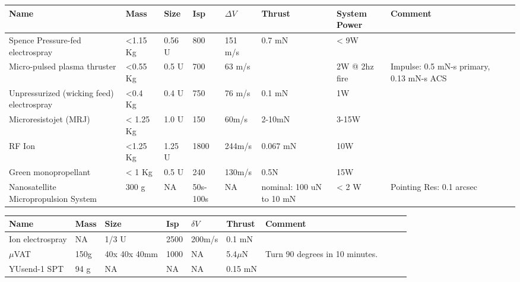 \begin{center}
     \begin{tabular}{ |p{2.25cm} | p{1cm} | p{1cm} |  p{1cm} | l | p{2cm} | l | p{4cm} | p{1cm} | p{2cm} |  }
     \hline

       {\bf Name} & {\bf Mass} & {\bf Size} & {\bf Isp} & {\bf $\Delta V$} & {\bf Thrust} & {\bf System Power}&{\bf Comment}  \\ \hline


     Spence Pressure-fed electrospray \cite{Spence} & <1.15 Kg& 0.56 U& 800 & 151 m/s & 0.7 mN &< 9W &   \\ \hline

     Micro-pulsed plasma thruster \cite{Spence} & <0.55 Kg& 0.5 U & 700 & 63 m/s&  & 2W @ 2hz fire &  Impulse: 0.5 mN-s primary, 0.13 mN-s ACS\\ \hline

     Unpressurized (wicking feed) electrospray \cite{Spence} & <0.4 Kg& 0.4 U& 750 & 76 m/s & 0.1 mN & 1W &  \\
     \hline

     Microresistojet (MRJ) \cite{Spence} & < 1.25 Kg& 1.0 U&150 & 60m/s & 2-10mN & 3-15W&   \\
     \hline

     RF Ion \cite{Spence} & <1.25 Kg& 1.25 U& 1800 & 244m/s & 0.067 mN &10W &   \\
     \hline

     Green monopropellant \cite{Spence} & < 1 Kg& 0.5 U& 240 & 130m/s & 0.5N & 15W&   \\
     \hline

	Nanosatellite Micropropulsion System \cite{Spence} & 300 g & NA &	50s-100s & NA & nominal: 100 uN to 10 mN & < 2 W & Pointing Res: 0.1 arcsec \\ \hline

     \end{tabular}
\end{center} 

\begin{center}
     \begin{tabular}{ |p{2cm} | p{1cm} | p{1cm} |  p{1cm} | l | l | l | p{5cm} | p{1cm} | p{1cm} }
     \hline

       {\bf Name} & {\bf Mass} & {\bf Size} & {\bf Isp} & {\bf $\delta V$} & {\bf Thrust} & {\bf Comment}  \\ \hline

     Ion electrospray \cite{Ref:thr9} & NA & 1/3 U & 2500 & 200m/s & 0.1 mN&  \\ \hline
     {$\mu$}VAT&150g& 40x 40x 40mm & 1000&  NA & 5.4{$\mu$}N & Turn 90 degrees in 10 minutes.\\ \hline
     YUsend-1 SPT \cite{Ref:thr10} &94 g & NA & NA   & NA & 0.15 mN & \\ \hline
     \end{tabular}
\end{center}

